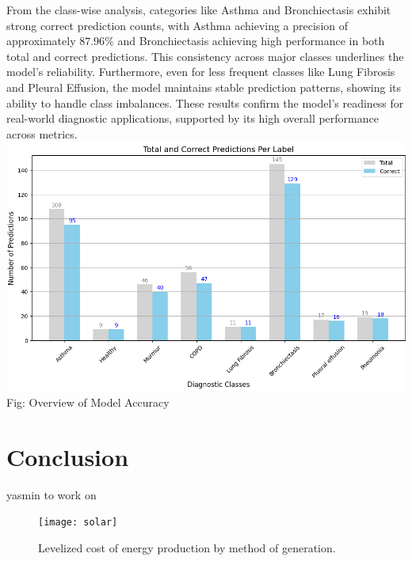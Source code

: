 \documentclass[twocolumn]{article}
\begin{document}
From the class-wise analysis, categories like Asthma and Bronchiectasis exhibit strong correct prediction counts, with Asthma achieving a precision of approximately \(87.96\%\) and Bronchiectasis achieving high performance in both total and correct predictions. This consistency across major classes underlines the model's reliability. Furthermore, even for less frequent classes like Lung Fibrosis and Pleural Effusion, the model maintains stable prediction patterns, showing its ability to handle class imbalances. These results confirm the model's readiness for real-world diagnostic applications, supported by its high overall performance across metrics.
\includegraphics[scale=0.3]{Diagnostic.png}
Fig: Overview of Model Accuracy
\section{Conclusion}
yasmin to work on 


\begin{figure}[h]
  \centering
  \texttt{[image: solar]}
  \caption{Levelized cost of energy production by method of 
  generation. \cite{heart}}
  \label{fig:solar_cheap}
\end{figure}

\cite{telehealth}




\appendix
\end{document}
